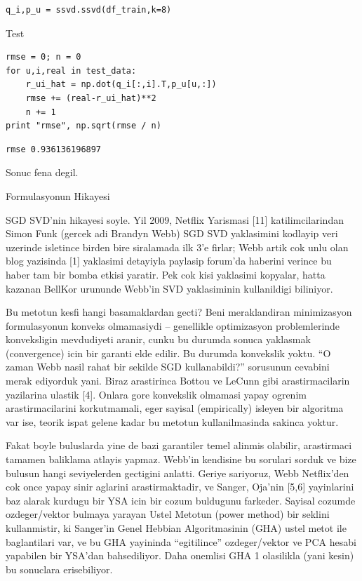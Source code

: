 \documentclass[12pt,fleqn]{article}\usepackage{../common}
\begin{document}
\begin{verbatim}
q_i,p_u = ssvd.ssvd(df_train,k=8)
\end{verbatim}

Test

\begin{verbatim}
rmse = 0; n = 0
for u,i,real in test_data:
    r_ui_hat = np.dot(q_i[:,i].T,p_u[u,:])
    rmse += (real-r_ui_hat)**2
    n += 1
print "rmse", np.sqrt(rmse / n)
\end{verbatim}

\begin{verbatim}
rmse 0.936136196897
\end{verbatim}

Sonuc fena degil.

Formulasyonun Hikayesi

SGD SVD'nin hikayesi soyle. Yil 2009, Netflix Yarismasi [11]
katilimcilarindan Simon Funk (gercek adi Brandyn Webb) SGD SVD yaklasimini
kodlayip veri uzerinde isletince birden bire siralamada ilk 3'e firlar;
Webb artik cok unlu olan blog yazisinda [1] yaklasimi detayiyla paylasip
forum'da haberini verince bu haber tam bir bomba etkisi yaratir. Pek cok
kisi yaklasimi kopyalar, hatta kazanan BellKor urununde Webb'in SVD
yaklasiminin kullanildigi biliniyor.

Bu metotun kesfi hangi basamaklardan gecti? Beni meraklandiran minimizasyon
formulasyonun konveks olmamasiydi -- genellikle optimizasyon problemlerinde
konveksligin mevdudiyeti aranir, cunku bu durumda sonuca yaklasmak
(convergence) icin bir garanti elde edilir. Bu durumda konvekslik
yoktu. ``O zaman Webb nasil rahat bir sekilde SGD kullanabildi?'' sorusunun
cevabini merak ediyorduk yani. Biraz arastirinca Bottou ve LeCunn gibi
arastirmacilarin yazilarina ulastik [4]. Onlara gore konvekslik olmamasi
yapay ogrenim arastirmacilarini korkutmamali, eger sayisal (empirically)
isleyen bir algoritma var ise, teorik ispat gelene kadar bu metotun
kullanilmasinda sakinca yoktur.

Fakat boyle buluslarda yine de bazi garantiler temel alinmis olabilir,
arastirmaci tamamen baliklama atlayis yapmaz. Webb'in kendisine bu sorulari
sorduk ve bize bulusun hangi seviyelerden gectigini anlatti. Geriye
sariyoruz, Webb Netflix'den cok once yapay sinir aglarini arastirmaktadir,
ve Sanger, Oja'nin [5,6] yayinlarini baz alarak kurdugu bir YSA icin bir
cozum buldugunu farkeder. Sayisal cozumde ozdeger/vektor bulmaya yarayan
Ustel Metotun (power method) bir seklini kullanmistir, ki Sanger'in Genel
Hebbian Algoritmasinin (GHA) ustel metot ile baglantilari var, ve bu GHA
yayininda ``egitilince'' ozdeger/vektor ve PCA hesabi yapabilen bir YSA'dan
bahsediliyor. Daha onemlisi GHA 1 olasilikla (yani kesin) bu sonuclara
erisebiliyor.
\end{document}
